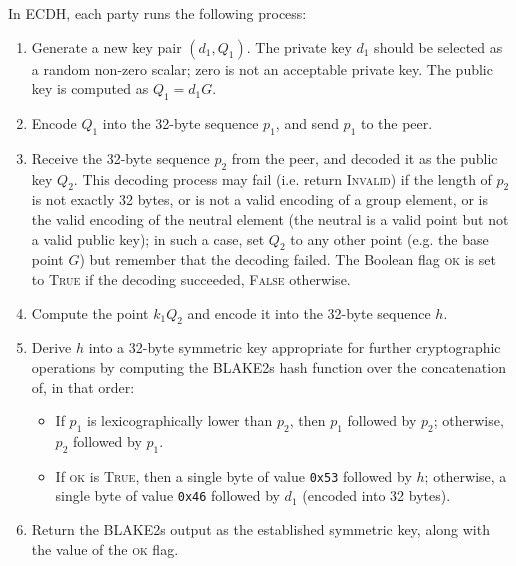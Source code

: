 \documentclass{llncs}
\begin{document}
In ECDH, each party runs the following process:
\begin{enumerate}

    \item Generate a new key pair $(d_1, Q_1)$. The private key $d_1$
    should be selected as a random non-zero scalar; zero is not an
    acceptable private key. The public key is computed as $Q_1 = d_1 G$.

    \item Encode $Q_1$ into the 32-byte sequence $p_1$, and send $p_1$
    to the peer.

    \item \label{step:ecdh-decode}Receive the 32-byte sequence $p_2$
    from the peer, and decoded it as the public key $Q_2$. This decoding
    process may fail (i.e. return \textsc{Invalid}) if the length of
    $p_2$ is not exactly 32 bytes, or is not a valid encoding of a group
    element, or is the valid encoding of the neutral element (the
    neutral is a valid point but not a valid public key); in such a
    case, set $Q_2$ to any other point (e.g. the base point $G$) but
    remember that the decoding failed. The Boolean flag \textsc{ok}
    is set to \textsc{True} if the decoding succeeded, \textsc{False}
    otherwise.

    \item Compute the point $k_1 Q_2$ and encode it into the 32-byte
    sequence $h$.

    \item Derive $h$ into a 32-byte symmetric key appropriate for further
    cryptographic operations by computing the BLAKE2s hash function
    over the concatenation of, in that order:
    \begin{itemize}

        \item If $p_1$ is lexicographically lower than $p_2$, then
        $p_1$ followed by $p_2$; otherwise, $p_2$ followed by $p_1$.

        \item If \textsc{ok} is \textsc{True}, then a single byte
        of value \verb+0x53+ followed by $h$; otherwise, a single
        byte of value \verb+0x46+ followed by $d_1$ (encoded into
        32 bytes).

    \end{itemize}

    \item Return the BLAKE2s output as the established symmetric key,
    along with the value of the \textsc{ok} flag.

\end{enumerate}
\end{document}
